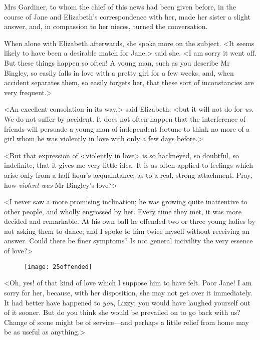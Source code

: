 Mrs Gardiner, to whom the chief of this news had been given before, in the course of Jane and Elizabeth's correspondence with her, made her sister a slight answer, and, in compassion to her nieces, turned the conversation.

When alone with Elizabeth afterwards, she spoke more on the subject. <It seems likely to have been a desirable match for Jane,> said she. <I am sorry it went off. But these things happen so often! A young man, such as you describe Mr Bingley, so easily falls in love with a pretty girl for a few weeks, and, when accident separates them, so easily forgets her, that these sort of inconstancies are very frequent.>

<An excellent consolation in its way,> said Elizabeth; <but it will not do for \textit{us}. We do not suffer by accident. It does not often happen that the interference of friends will persuade a young man of independent fortune to think no more of a girl whom he was violently in love with only a few days before.>

<But that expression of <violently in love> is so hackneyed, so doubtful, so indefinite, that it gives me very little idea. It is as often applied to feelings which arise only from a half hour's acquaintance, as to a real, strong attachment. Pray, how \textit{violent was} Mr Bingley's love?>

<I never saw a more promising inclination; he was growing quite inattentive to other people, and wholly engrossed by her. Every time they met, it was more decided and remarkable. At his own ball he offended two or three young ladies by not asking them to dance; and I spoke to him twice myself without receiving an answer. Could there be finer symptoms? Is not general incivility the very essence of love?>


\begin{figure}[tbh]
\centering
\texttt{[image: 25offended]}
\end{figure}


<Oh, yes! of that kind of love which I suppose him to have felt. Poor Jane! I am sorry for her, because, with her disposition, she may not get over it immediately. It had better have happened to \textit{you}, Lizzy; you would have laughed yourself out of it sooner. But do you think she would be prevailed on to go back with us? Change of scene might be of service—and perhaps a little relief from home may be as useful as anything.>

